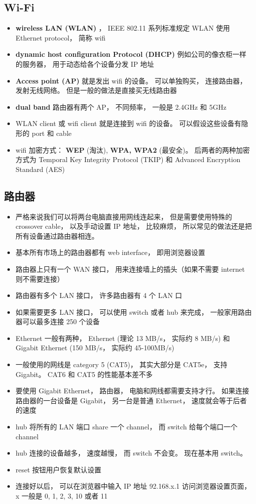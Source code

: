 \subsection{Wi-Fi}
\begin{itemize}
\item \textbf{wireless LAN (WLAN)} ， IEEE 802.11 系列标准规定 WLAN 使用 Ethernet protocol， 简称 wifi
\item \textbf{dynamic host configuration Protocol (DHCP)} 例如公司的像衣柜一样的服务器， 用于动态给各个设备分发 IP 地址
\item \textbf{Access point (AP)} 就是发出 wifi 的设备。 可以单独购买， 连接路由器， 发射无线网络。 但是一般的做法是直接买无线路由器
\item \textbf{dual band} 路由器有两个 AP， 不同频率， 一般是 2.4GHz 和 5GHz
\item WLAN client 或 wifi client 就是连接到 wifi 的设备。 可以假设这些设备有隐形的 port 和 cable
\item wifi 加密方式： \textbf{WEP} (淘汰), \textbf{WPA, WPA2} (最安全)。 后两者的两种加密方式为 Temporal Key Integrity Protocol (TKIP) 和 Advanced Encryption Standard (AES)
\end{itemize}

\subsection{路由器}
\begin{itemize}
\item 严格来说我们可以将两台电脑直接用网线连起来， 但是需要使用特殊的 crossover cable， 以及手动设置 IP 地址， 比较麻烦， 所以常见的做法还是把所有设备通过路由器相连。
\item 基本所有市场上的路由器都有 web interface， 即用浏览器设置
\item 路由器上只有一个 WAN 接口， 用来连接墙上的插头（如果不需要 internet 则不需要连接）
\item 路由器有多个 LAN 接口， 许多路由器有 4 个 LAN 口
\item 如果需要更多 LAN 接口， 可以使用 switch 或者 hub 来完成， 一般家用路由器可以最多连接 250 个设备
\item Ethernet 一般有两种， Ethernet (理论 13 MB/s， 实际约 8 MB/s) 和 Gigabit Ethernet (150 MB/s， 实际约 45-100MB/s)
\item 一般使用的网线是 category 5 (CAT5)， 其实大部分是 CAT5e， 支持 Gigabit。 CAT6 和 CAT5 的性能基本差不多
\item 要使用 Gigabit Ethernet， 路由器， 电脑和网线都需要支持才行。 如果连接路由器的一台设备是 Gigabit， 另一台是普通 Ethernet， 速度就会等于后者的速度
\item hub 将所有的 LAN 端口 share 一个 channel， 而 switch 给每个端口一个 channel
\item hub 连接的设备越多， 速度越慢， 而 switch 不会变。 现在基本用 switch。
\item reset 按钮用户恢复默认设置
\item 连接好以后， 可以在浏览器中输入 IP 地址 92.168.x.1 访问浏览器设置页面， x 一般是 0, 1, 2, 3, 10 或者 11
\end{itemize}

